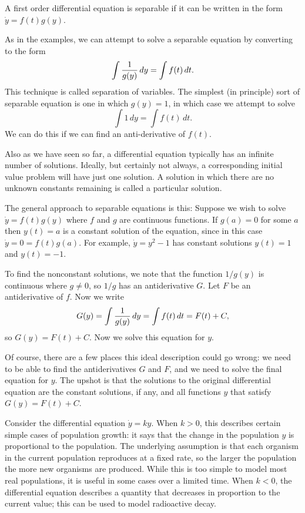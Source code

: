  A first order differential equation is 
{\dfont separable\/} if it
can be written in the form
$\dot{y} = f(t) g(y)$.
\enddef

As in the examples, we can attempt to solve a separable equation by
converting to the form
$$\int {1\over g(y)}\,dy=\int f(t)\,dt.$$
This technique is called {\dfont separation of
  variables}. The simplest (in
principle) sort of separable equation is one in which $g(y)=1$, in
which case we attempt to solve
$$\int 1\,dy=\int f(t)\,dt.$$
We can do this if we can find an anti-derivative of $f(t)$.

Also as we have seen so far, a differential equation
typically has an infinite number of solutions. Ideally, but certainly
not always, a corresponding initial value problem will have just one
solution. A solution in which there are no unknown constants remaining
is called a {\dfont particular 
solution}.

The general approach to separable equations is this:
Suppose we wish to solve $\dot{y} =
f(t) g(y) $ where $f$ and $g$ are continuous functions. If $g(a)=0$
for some $a$ then $y(t)=a$ is a constant solution of the equation,
since in this case $\dot y = 0 = f(t)g(a)$.  For example, $\dot{y}
=y^2 -1$ has constant solutions $y(t)=1$ and $y(t)=-1$.

To find the nonconstant solutions, we note that the function
$1/g(y)$ is continuous where $g\not=0$, so
$1/g$ has an antiderivative $G$. Let $F$ be an
antiderivative of $f$.  
Now we write 
$$G(y) = \int {1\over g(y)}\,dy = \int f(t)\,dt=F(t)+C,$$
so $G(y)=F(t)+C$. Now we solve this equation for $y$. 

Of course, there are a few places this ideal description could go
wrong: we need to be able to find the antiderivatives $G$ and $F$, and
we need to solve the final equation for $y$.
The upshot is that the solutions to the original differential equation
are the constant solutions, if any, and all functions $y$ that satisfy
$G(y)=F(t)+C$.


\example Consider the differential equation $\dot y=ky$.
When $k>0$, this describes certain simple cases of population growth:
it says that the change in the population $y$ is proportional to the
population. The underlying assumption is that each organism in the
current population reproduces at a fixed rate, so the larger the
population the more new organisms are produced. While this is too
simple to model most real populations, it is useful in some cases over
a limited time. When $k<0$, the differential equation describes a
quantity that decreases in proportion to the current value; this can
be used to model radioactive decay.

